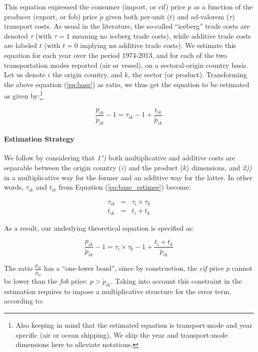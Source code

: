\documentclass[a4paper,11pt]{article}
\begin{document}
\noindent This equation expressed the consumer (import, or cif) price $p$ as a function of the producer (export, or fob) price $\widetilde{p}$ given both per-unit ($t$) and ad-valorem ($\tau$) transport costs. As usual in the literature, the so-called ``iceberg'' trade costs are denoted $\tau$ (with $\tau=1$ meaning no iceberg trade costs), while additive trade costs are labeled $t$ (with $t=0$ implying no additive trade costs). We estimate this equation for each year over the period 1974-2013, and for each of the two transportation modes reported (air or vessel), on a sectoral-origin country basis. Let us denote $i$ the origin country, and $k$, the sector (or product). Transforming the above equation (\ref{eq:base}) as ratio, we thus get the equation to be estimated as given by:\footnote{Also keeping in mind that the estimated equation is transport-mode and year specific (air or ocean shipping). We skip the year and transport-mode dimensions here to alleviate notations.}

\begin{equation}
\frac{p_{ik}}{\widetilde{p}_{ik}} -1 = \tau_{ik} -1 +\frac{t_{ik}}{ \widetilde{p}_{ik}} \label{eq:base_estimee}
\end{equation}


\paragraph{Estimation Strategy} We follow \citet{Irrazabal_2015} by considering that \textit{1°)} both multiplicative and additive costs are separable between the origin country ($i$) and the product ($k$) dimensions, and \textit{2))} in a multiplicative way for the former and an additive way for the latter. In other words, $\tau_{ik}$ and $t_{ik}$ from Equation (\ref{eq:base_estimee}) become:

\begin{eqnarray}
\tau_{ik} &=& \tau_{i} \times \tau_{k} \label{eq:iceberg}\\
t_{ik} &=& t_{i} + t_{k} \label{eq:add}
\end{eqnarray}


As a result, our underlying theoretical equation is specified as:

\begin{equation}
\frac{p_{ik}}{\widetilde{p}_{ik}}-1 =\tau_{i} \times \tau_{k} -1 +\frac{t_{i} + t_{k}}{ \widetilde{p}_{ik}} \label{eq:theory_equation}
\end{equation}

The ratio $\frac{p_{ik}}{\widetilde{p}_{ik}}$ has a ``one-lower bond'', since by construction, the \emph{cif} price $p$ cannot be lower than the \emph{fob} price: $p>\widetilde{p}_{ik}$. Taking into account this constraint in the estimation requires to impose a multiplicative structure for the error term, according to:
\end{document}
